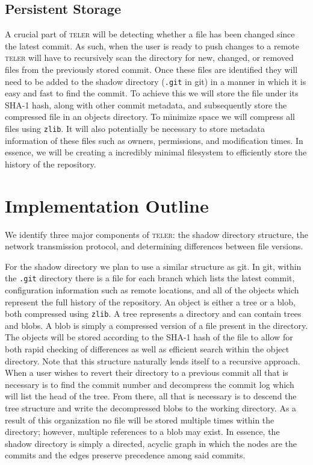 \documentclass[12pt, letterpaper]{article}
\begin{document}
\subsection{Persistent Storage}
\label{sec:storage}

A crucial part of \textsc{teler} will be detecting whether a file has
been changed since the latest commit. As such, when the user is ready
to push changes to a remote \textsc{teler} will have to recursively
scan the directory for new, changed, or removed files from the
previously stored commit. Once these files are identified they will
need to be added to the shadow directory (\texttt{.git} in git) in a
manner in which it is easy and fast to find the commit. To achieve
this we will store the file under its SHA-1 hash, along with
other commit metadata, and subsequently store the compressed file in
an objects directory. To minimize space we will compress all files
using \texttt{zlib}. It will also potentially be necessary to store
metadata information of these files such as owners, permissions,
and modification times. In essence, we will be creating a incredibly
minimal filesystem to efficiently store the history of the repository.

\section{Implementation Outline}
\label{sec:implementation}
We identify three major components of \textsc{teler}: the shadow
directory structure, the network transmission protocol, and
determining differences between file versions.

For the shadow directory we plan to use a similar structure as git.
In git, within the \texttt{.git} directory there is a file for
each branch which lists the latest commit, configuration information
such as remote locations, and all of the objects which represent the
full history of the repository. An object is either a tree or a blob,
both compressed using \texttt{zlib}. A tree represents a directory and
can contain trees and blobs. A blob is simply a compressed version of
a file present in the directory. The objects will be stored according
to the SHA-1 hash of the file to allow for both rapid checking of
differences as well as efficient search within the object directory.
Note that this structure naturally lends itself to a recursive
approach. When a user wishes to revert their directory to a previous
commit all that is necessary is to find the commit number and decompress
the commit log which will list the head of the tree. From there, all
that is necessary is to descend the tree structure and write the
decompressed blobs to the working directory. As a result of this
organization no file will be stored multiple times within the
directory; however, multiple references to a blob may exist. In essence, the shadow
directory is simply a directed, acyclic graph in which the nodes are
the commits and the edges preserve precedence among said commits.
\end{document}
